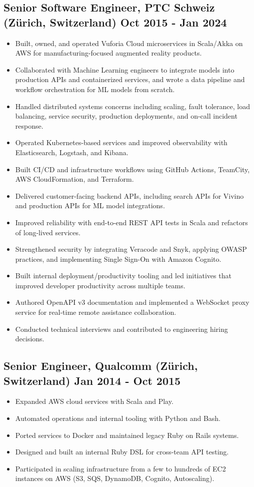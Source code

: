 \documentclass[11pt,a4paper]{article}
\begin{document}
\subsection*{Senior Software Engineer, PTC Schweiz (Zürich, Switzerland) \hfill Oct 2015 - Jan 2024}
\begin{itemize}
  \item Built, owned, and operated Vuforia Cloud microservices in Scala/Akka on AWS for manufacturing-focused augmented reality products.
  \item Collaborated with Machine Learning engineers to integrate models into production APIs and containerized services, and wrote a data pipeline and workflow orchestration for ML models from scratch.
  \item Handled distributed systems concerns including scaling, fault tolerance, load balancing, service security, production deployments, and on-call incident response.
  \item Operated Kubernetes-based services and improved observability with Elasticsearch, Logstash, and Kibana.
  \item Built CI/CD and infrastructure workflows using GitHub Actions, TeamCity, AWS CloudFormation, and Terraform.
  \item Delivered customer-facing backend APIs, including search APIs for Vivino and production APIs for ML model integrations.
  \item Improved reliability with end-to-end REST API tests in Scala and refactors of long-lived services.
  \item Strengthened security by integrating Veracode and Snyk, applying OWASP practices, and implementing Single Sign-On with Amazon Cognito.
  \item Built internal deployment/productivity tooling and led initiatives that improved developer productivity across multiple teams.
  \item Authored OpenAPI v3 documentation and implemented a WebSocket proxy service for real-time remote assistance collaboration.
  \item Conducted technical interviews and contributed to engineering hiring decisions.
\end{itemize}

\subsection*{Senior Engineer, Qualcomm (Zürich, Switzerland) \hfill Jan 2014 - Oct 2015}
\begin{itemize}
  \item Expanded AWS cloud services with Scala and Play.
  \item Automated operations and internal tooling with Python and Bash.
  \item Ported services to Docker and maintained legacy Ruby on Rails systems.
  \item Designed and built an internal Ruby DSL for cross-team API testing.
  \item Participated in scaling infrastructure from a few to hundreds of EC2 instances on AWS (S3, SQS, DynamoDB, Cognito, Autoscaling).
\end{itemize}
\end{document}
